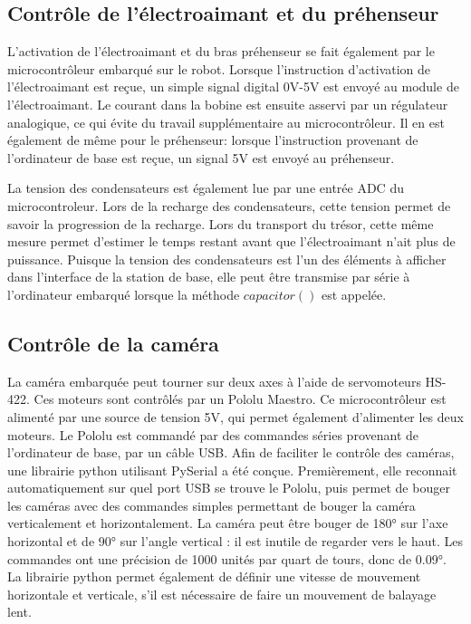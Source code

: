 \subsection{Contrôle de l'électroaimant et du préhenseur}

L’activation de l’électroaimant et du bras préhenseur se fait également par le microcontrôleur embarqué sur le robot. Lorsque l’instruction d’activation de l’électroaimant est reçue, un simple signal
digital 0V-5V est envoyé au module de l’électroaimant. Le courant dans la bobine est ensuite asservi par un régulateur analogique, ce qui évite du travail supplémentaire au microcontrôleur.
Il en est également de même pour le préhenseur: lorsque l’instruction provenant de l’ordinateur de base est reçue, un signal 5V est envoyé au préhenseur.

La tension des condensateurs est également lue par une entrée ADC du microcontroleur. Lors de la recharge des condensateurs, cette tension permet de savoir la progression de la recharge.
Lors du transport du trésor, cette même mesure permet d’estimer le temps restant avant que l’électroaimant n’ait plus de puissance. Puisque la tension des condensateurs est l’un des éléments
à afficher dans l’interface de la station de base, elle peut être transmise par série à l’ordinateur embarqué lorsque la méthode $capacitor()$ est appelée.

\subsection{Contrôle de la caméra}

La caméra embarquée peut tourner sur deux axes à l’aide de servomoteurs HS-422. Ces moteurs sont contrôlés par un Pololu Maestro. Ce microcontrôleur est alimenté par une source de tension 5V,
qui permet également d’alimenter les deux moteurs. Le Pololu est commandé par des commandes séries provenant de l’ordinateur de base, par un câble USB. Afin de faciliter le contrôle des caméras,
une librairie python utilisant PySerial a été conçue. Premièrement, elle reconnait automatiquement sur quel port USB se trouve le Pololu, puis permet de bouger les caméras avec des commandes simples
permettant de bouger la caméra verticalement et horizontalement. La caméra peut être bouger de 180° sur l’axe horizontal et de 90° sur l’angle vertical : il est inutile de regarder vers le haut.
Les commandes ont une précision de 1000 unités par quart de tours, donc de 0.09°. La librairie python permet également de définir une vitesse de mouvement horizontale et verticale, s’il est nécessaire
de faire un mouvement de balayage lent.




